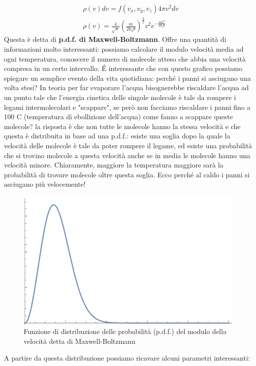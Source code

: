 \documentclass[
10pt, %
a4paper, %
oneside, %
headinclude,footinclude, %
BCOR5mm, %
]{scrartcl}
\begin{document}
\FloatBarrier
\begin{align}\label{eq:pdfMaxwellvelocità}
	&\rho(v) dv = f(v_x, v_y, v_z) 4\pi v^2 dv \nonumber \\
	&\rho(v)=\frac{4}{\sqrt{\pi}}\left(\frac{m}{2k_b\theta}\right)^{\frac{3}{2}} v^2 e^{-\frac{mv^2}{2 k_b \theta}}
\end{align} 
Questa è detta di \textbf{p.d.f. di Maxwell-Boltzmann}. Offre una quantità di informazioni molto interessanti: possiamo calcolare il modulo velocità media ad ogni temperatura, conoscere il numero di molecole atteso che abbia una velocità compresa in un certo intervallo. \'{E} interessante che con questo grafico possiamo spiegare un semplice evento della vita quotidiana: perché i panni si asciugano una volta stesi? In teoria per far evaporare l'acqua bisognerebbe riscaldare l'acqua ad un punto tale che l'energia cinetica delle singole molecole è tale da rompere i legami intermolecolari e "scappare", se però non facciamo riscaldare i panni fino a 100 \textdegree C (temperatura di ebollizione dell'acqua) come fanno a scappare queste molecole? la risposta è che non tutte le molecole hanno la stessa velocità e che questa è distribuita in base ad una p.d.f.: esiste una soglia dopo la quale la velocità delle molecole è tale da poter rompere il legame, ed esiste una probabilità che si trovino molecole a questa velocità anche se in media le molecole hanno una velocità minore. Chiaramente, maggiore la temperatura maggiore sarà la probabilità di trovare molecole oltre questa soglia. Ecco perché al caldo i panni si asciugano più velocemente!
\begin{figure}[h!]
	\centering
	\includegraphics[width=0.6\linewidth]{../images/speedpdf}
	\caption{Funzione di distribuzione delle probabilità (p.d.f.) del modulo della velocità detta di Maxwell-Boltzmann}
	\label{fig:speedpdf}
\end{figure}
\FloatBarrier
A partire da questa distribuzione possiamo ricavare alcuni parametri interessanti:
\end{document}
